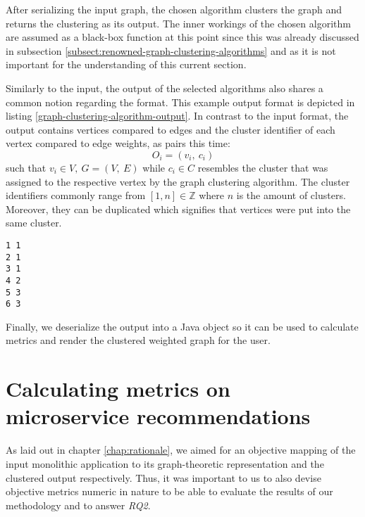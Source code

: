 \documentclass[12pt,a4paper]{report}
\begin{document}
After serializing the input graph, the chosen algorithm clusters the graph
and returns the clustering as its output. The inner workings of the chosen
algorithm are assumed as a black-box function at this point since this was
already discussed in subsection \ref{subsect:renowned-graph-clustering-algorithms}
and as it is not important for the understanding of this current section.

Similarly to the input, the output of the selected algorithms also shares
a common notion regarding the format. This example output format is depicted
in listing \ref{graph-clustering-algorithm-output}.
In contrast to the input format, the output contains vertices compared to edges
and the cluster identifier of each vertex compared to edge weights,
as pairs this time:
\[
  O_i = (v_i, \ c_i)
\]
such that \(v_i \in V, \ G = (V, \ E)\) while \(c_i \in C\) resembles the
cluster that was assigned to the respective vertex by the graph clustering
algorithm. The cluster identifiers commonly range from \([1, n] \in \mathbb{Z}\)
where \(n\) is the amount of clusters. Moreover, they can be duplicated
which signifies that vertices were put into the same cluster.

\begin{lstlisting}[caption=Example graph clustering algorithm output, label=graph-clustering-algorithm-output, breaklines=true]
1 1
2 1
3 1
4 2
5 3
6 3
\end{lstlisting}

Finally, we deserialize the output into a Java object so it can be used to
calculate metrics and render the clustered weighted graph for the user.




\chapter{Calculating metrics on microservice recommendations} \label{chap:metrics}

As laid out in chapter \ref{chap:rationale}, we aimed for an objective
mapping of the input monolithic application to its graph-theoretic representation
and the clustered output respectively.
Thus, it was important to us to also devise objective metrics numeric in nature
to be able to evaluate the results of our methodology and to answer \textit{RQ2}.
\end{document}
